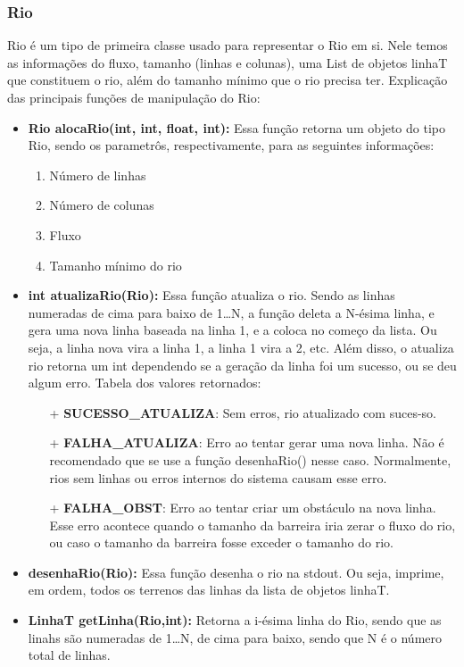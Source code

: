 \documentclass[11pt]{article}
\begin{document}
\subsubsection{Rio}

Rio é um tipo de primeira classe usado para representar o Rio em si. Nele temos as informações do fluxo, tamanho (linhas e colunas), uma List de objetos linhaT que constituem o rio, além do tamanho mínimo que o rio precisa ter.
Explicação das principais funções de manipulação do Rio:

\begin{itemize}

	\item \textbf{Rio alocaRio({\color{red}int}, {\color{red}int}, {\color{red}f\mbox{}loat}, {\color{red}int}):} Essa função retorna um objeto do tipo Rio, sendo os parametrôs, respectivamente, para as seguintes informações:
	\begin{enumerate}
		\item Número de linhas
		\item Número de colunas
		\item Fluxo
		\item Tamanho mínimo do rio		
	\end{enumerate}
	
	\item \textbf{int atualizaRio({\color{red}Rio}):} Essa função atualiza o rio. Sendo as linhas numeradas de cima para baixo de 1\ldots N, a função deleta a N-ésima linha, e gera uma nova linha baseada na linha 1, e a coloca no começo da lista. Ou seja, a linha nova vira a linha 1, a linha 1 vira a 2, etc.	
	Além disso, o atualiza rio retorna um int dependendo se a geração da linha foi um sucesso, ou se deu algum erro. Tabela dos valores retornados:
	
	\begin{itemize}
	\item[+]\textbf{SUCESSO\_{}ATUALIZA}: Sem erros, rio atualizado com suces-so.
    \item[+]\textbf{FALHA\_{}ATUALIZA}: Erro ao tentar gerar uma nova linha. Não é recomendado que se use a função desenhaRio() nesse caso. Normalmente, rios sem linhas ou erros internos do sistema causam esse erro.
    \item[+]\textbf{FALHA\_{}OBST}: Erro ao tentar criar um obstáculo na nova linha. Esse erro acontece quando o tamanho da barreira iria zerar o fluxo
    do rio, ou caso o tamanho da barreira fosse exceder o tamanho do rio.
    	\end{itemize}
    
    \item\textbf{desenhaRio({\color{red}Rio}):} Essa função desenha o rio na stdout. Ou seja, imprime, em ordem, todos os terrenos das linhas da lista de objetos linhaT.
	
	\item\textbf{LinhaT getLinha({\color{red}Rio},{\color{red}int}):} Retorna a i-ésima linha do Rio, sendo que as linahs são numeradas de 1\ldots N, de cima para baixo, sendo que N é o número total de linhas.
\author{Meninos bolados}
		

\end{itemize}
\end{document}
